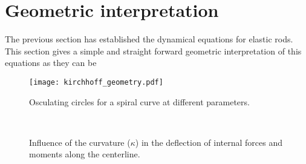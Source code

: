 \clearpage
\makebox[\textwidth]{} %
\section{Geometric interpretation}

The previous section has established the dynamical equations for elastic rods. This section gives a simple and straight forward geometric interpretation of this equations as they can be 
 
\begin{figure}[h]
	\centering
	\texttt{[image: kirchhoff\_geometry.pdf]}
	\caption{Osculating circles for a spiral curve at different parameters.}
	\label{fig:5}
\end{figure} 

\begin{figure}[p]
  \begin{leftfullpage}
    \captionsetup[subfloat]{captionskip=10pt}
     	\centering
     	 \\
	\vspace{30pt}
	\vspace{30pt}
	\caption{Influence of the curvature ($\kappa$) in the deflection of internal forces and moments along the centerline.}     
	\label{fig:5_2}
 \end{leftfullpage}
\end{figure}

